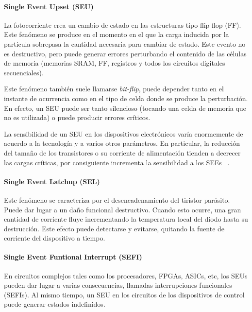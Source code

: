\documentclass[a4paper,openright,12pt]{report}
\begin{document}
\paragraph{Single Event Upset (SEU) } \hfill \break

La fotocorriente crea un cambio de estado en las estructuras tipo flip-flop (FF). Este fenómeno se produce en el momento en el que la carga inducida por la partícula sobrepasa la cantidad necesaria para cambiar de estado. Este evento no es destructivo, pero puede generar errores perturbando el contenido de las células de memoria (memorias SRAM, FF, registros y todos los circuitos digitales secuenciales).

Este fenómeno también suele llamarse \textit{bit-flip}, puede depender tanto en el instante de ocurrencia como en el tipo de celda donde se produce la perturbación. En efecto, un SEU puede ser tanto silencioso (tocando una celda de memoria que no es utilizada) o puede producir errores críticos.

La sensibilidad de un SEU en los dispositivos electrónicos varía enormemente de acuerdo a la tecnología y a varios otros parámetros. En particular, la reducción del tamaño de los transistores o su corriente de alimentación tienden a decrecer las cargas críticas, por consiguiente incrementa la sensibilidad a los SEEs ~\cite{ grandstrand:2004}.


\paragraph{Single Event Latchup (SEL) } \hfill \break

Este fenómeno se caracteriza por el desencadenamiento del tiristor parásito. Puede dar lugar a un daño funcional destructivo. Cuando esto ocurre, una gran cantidad de corriente fluye incrementando la temperatura local del diodo hasta su destrucción. Este efecto puede detectarse y evitarse, quitando la fuente de corriente del dispositivo a tiempo.



\paragraph{Single Event Funtional Interrupt (SEFI) } \hfill \break

En circuitos complejos tales como los procesadores, FPGAs, ASICs, etc, los SEUs pueden dar lugar a varias consecuencias, llamadas interrupciones funcionales (SEFIs). Al mismo tiempo, un SEU en los circuitos de los dispositivos de control puede generar estados indefinidos. 
\end{document}
